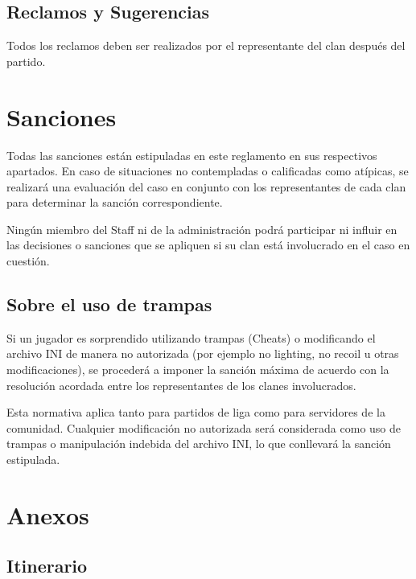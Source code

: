 \documentclass[a4paper, 11pt]{article}
\begin{document}
    \subsection{Reclamos y Sugerencias}

    Todos los reclamos deben ser realizados por el representante del clan después del partido.

    \clearpage

    \section{Sanciones}
    Todas las sanciones están estipuladas en este reglamento en sus respectivos apartados. En caso de situaciones no contempladas o calificadas como atípicas, se realizará una evaluación del caso en conjunto con los representantes de cada clan para determinar la sanción correspondiente.

    Ningún miembro del Staff ni de la administración podrá participar ni influir en las decisiones o sanciones que se apliquen si su clan está involucrado en el caso en cuestión.

    \subsection{Sobre el uso de trampas}
    Si un jugador es sorprendido utilizando trampas (Cheats) o modificando el archivo INI de manera no autorizada (por ejemplo no lighting, no recoil u otras modificaciones), se procederá a imponer la sanción máxima de acuerdo con la resolución acordada entre los representantes de los clanes involucrados.

    Esta normativa aplica tanto para partidos de liga como para servidores de la comunidad. Cualquier modificación no autorizada será considerada como uso de trampas o manipulación indebida del archivo INI, lo que conllevará la sanción estipulada.

    \clearpage

    \appendix
    \section{Anexos}
    \subsection{Itinerario}
\end{document}
